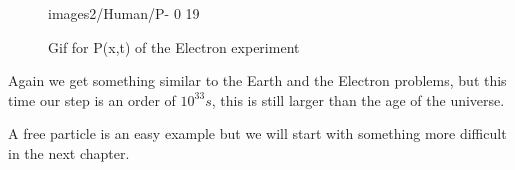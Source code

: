 \begin{figure}[H]
    \centering
    {images2/Human/P-}%
    {0}%
    {19}%
    \caption{Gif for P(x,t) of the Electron experiment}
    \label{P_human}
\end{figure}


Again we get something similar to the Earth and the Electron problems, but this time our step is an order of $10^{33} s$, this is still larger than the age of the universe.


A free particle is an easy example but we will start with something more difficult in the next chapter.









